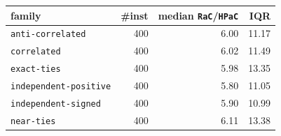 \begin{tabular}{@{}lrrr@{}}
\toprule
family & \#inst & median \texttt{RaC}/\texttt{HPaC} & IQR \\
\midrule
\texttt{anti-correlated} & 400 & 6.00 & 11.17 \\
\texttt{correlated} & 400 & 6.02 & 11.49 \\
\texttt{exact-ties} & 400 & 5.98 & 13.35 \\
\texttt{independent-positive} & 400 & 5.80 & 11.05 \\
\texttt{independent-signed} & 400 & 5.90 & 10.99 \\
\texttt{near-ties} & 400 & 6.11 & 13.38 \\
\bottomrule
\end{tabular}
